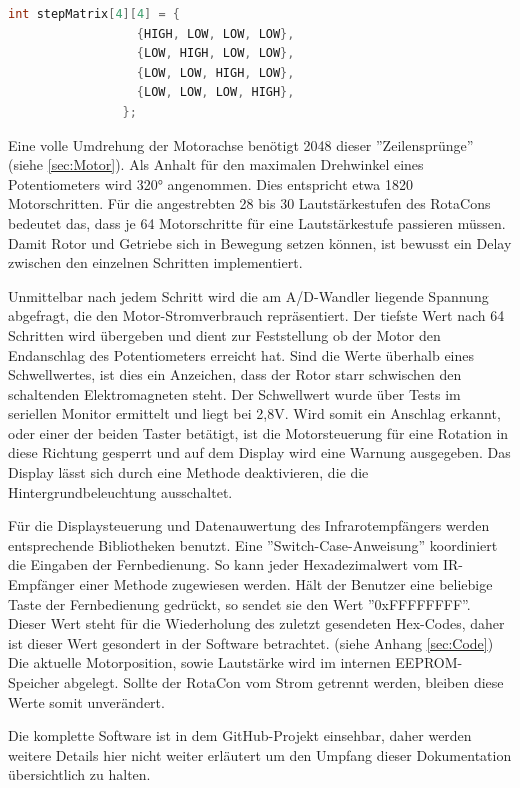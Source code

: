 \documentclass[11pt, titlepage]{report}
\begin{document}
			\begin{lstlisting}[gobble=28, language=C++]
				int stepMatrix[4][4] = {
  				  {HIGH, LOW, LOW, LOW},
  				  {LOW, HIGH, LOW, LOW},
  				  {LOW, LOW, HIGH, LOW},
  				  {LOW, LOW, LOW, HIGH},
				};
			\end{lstlisting}

			Eine volle Umdrehung der Motorachse benötigt 2048 dieser ''Zeilensprünge'' (siehe \ref{sec:Motor}). Als Anhalt für den maximalen Drehwinkel eines Potentiometers wird 320° angenommen. Dies entspricht etwa 1820 Motorschritten. Für die angestrebten 28 bis 30 Lautstärkestufen des RotaCons bedeutet das, dass je 64 Motorschritte für eine Lautstärkestufe passieren müssen. Damit Rotor und Getriebe sich in Bewegung setzen können, ist bewusst ein Delay zwischen den einzelnen Schritten implementiert.

			Unmittelbar nach jedem Schritt wird die am A/D-Wandler liegende Spannung abgefragt, die den Motor-Stromverbrauch repräsentiert. Der tiefste Wert nach 64 Schritten wird übergeben und dient zur Feststellung ob der Motor den Endanschlag des Potentiometers erreicht hat. Sind die Werte überhalb eines Schwellwertes, ist dies ein Anzeichen, dass der Rotor starr schwischen den schaltenden Elektromagneten steht. Der Schwellwert wurde über Tests im seriellen Monitor ermittelt und liegt bei 2,8V.\newline
			Wird somit ein Anschlag erkannt, oder einer der beiden Taster betätigt, ist die Motorsteuerung für eine Rotation in diese Richtung gesperrt und auf dem Display wird eine Warnung ausgegeben. Das Display lässt sich durch eine Methode deaktivieren, die die Hintergrundbeleuchtung ausschaltet.

			Für die Displaysteuerung und Datenauwertung des Infrarotempfängers werden entsprechende Bibliotheken benutzt. Eine ''Switch-Case-Anweisung'' koordiniert die Eingaben der Fernbedienung. So kann jeder Hexadezimalwert vom IR-Empfänger einer Methode zugewiesen werden. Hält der Benutzer eine beliebige Taste der Fernbedienung gedrückt, so sendet sie den Wert ''0xFFFFFFFF''. Dieser Wert steht für die Wiederholung des zuletzt gesendeten Hex-Codes, daher ist dieser Wert gesondert in der Software betrachtet. (siehe Anhang \ref{sec:Code}) 
			Die aktuelle Motorposition, sowie Lautstärke wird im internen EEPROM-Speicher abgelegt. Sollte der RotaCon vom Strom getrennt werden, bleiben diese Werte somit unverändert.
			
			Die komplette Software ist in dem GitHub-Projekt einsehbar, daher werden weitere Details hier nicht weiter erläutert um den Umpfang dieser Dokumentation übersichtlich zu halten.
		\newpage
\end{document}
